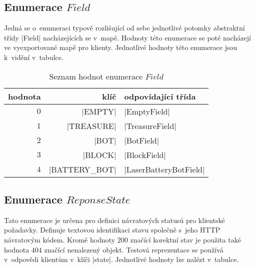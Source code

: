 \subsection{Enumerace $Field$}

Jedná se o~enumeraci typově rozlišující od sebe jednotlivé potomky abstraktní třídy \ic|Field| nacházejících se v~mapě. Hodnoty této enumerace se poté nacházejí ve vyexportované mapě pro klienty. Jednotlivé hodnoty této enumerace jsou k~vidění v~tabulce.

\begin{table}[H]
    \caption{Seznam hodnot enumerace $Field$}
    \label{table:field-enum-values}
	\centering
	\begin{tabular}{ r r | l }
		hodnota & klíč & odpovídající třída \\
		\hline
		$0$ & \ic|EMPTY| & \ic|EmptyField| \\
		$1$ & \ic|TREASURE| & \ic|TreasureField| \\
		$2$ & \ic|BOT| & \ic|BotField| \\
		$3$ & \ic|BLOCK| & \ic|BlockField| \\
		$4$ & \ic|BATTERY_BOT| & \ic|LaserBatteryBotField| \\
	\end{tabular}
\end{table}

\subsection{Enumerace $ReponseState$}

Tato enumerace je určena pro definici návratových statusů pro klientské požadavky. Definuje textovou identifikaci stavu společně s~jeho HTTP návratovým kódem. Kromě hodnoty $200$ značící korektní stav je použita také hodnota $404$ značící nenalezený objekt. Testová reprezentace se používá v~odpovědi klientům v~klíči \ic|state|. Jednotlivé hodnoty lze nalézt v~tabulce.

